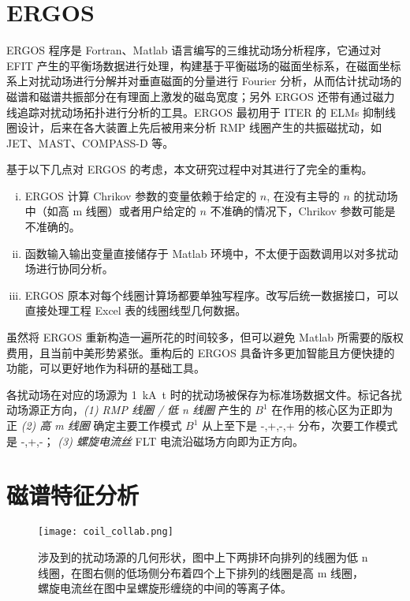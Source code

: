 \section{ERGOS}

ERGOS 程序是 Fortran、Matlab 语言编写的三维扰动场分析程序，它通过对 EFIT 产生的平衡场数据进行处理，构建基于平衡磁场的磁面坐标系，在磁面坐标系上对扰动场进行分解并对垂直磁面的分量进行 Fourier 分析，从而估计扰动场的磁谱和磁谱共振部分在有理面上激发的磁岛宽度；另外 ERGOS 还带有通过磁力线追踪对扰动场拓扑进行分析的工具。ERGOS 最初用于 ITER 的 ELMs 抑制线圈设计，后来在各大装置上先后被用来分析 RMP 线圈产生的共振磁扰动，如 JET、MAST、COMPASS-D 等。

基于以下几点对 ERGOS 的考虑，本文研究过程中对其进行了完全的重构。

\begin{enumerate}[(i)]
  \item ERGOS 计算 Chrikov 参数的变量依赖于给定的 $n$, 在没有主导的 $n$ 的扰动场中（如高 m 线圈）或者用户给定的 $n$ 不准确的情况下，Chrikov 参数可能是不准确的。
  \item 函数输入输出变量直接储存于 Matlab 环境中，不太便于函数调用以对多扰动场进行协同分析。
  \item ERGOS 原本对每个线圈计算场都要单独写程序。改写后统一数据接口，可以直接处理工程 Excel 表的线圈线型几何数据。
\end{enumerate}


虽然将 ERGOS 重新构造一遍所花的时间较多，但可以避免 Matlab 所需要的版权费用，且当前中美形势紧张。重构后的 ERGOS 具备许多更加智能且方便快捷的功能，可以更好地作为科研的基础工具。

各扰动场在对应的场源为 \SI{1}{\kilo\ampere t} 时的扰动场被保存为标准场数据文件。标记各扰动场源正方向，\textit{(1) RMP 线圈 / 低 n 线圈} 产生的 $B^1$ 在作用的核心区为正即为正  \textit{(2) 高 m 线圈} 确定主要工作模式 $B^1$ 从上至下是 -,+,-,+ 分布，次要工作模式是 -,+,-； \textit{(3) 螺旋电流丝} FLT 电流沿磁场方向即为正方向。


  
    


  


\section{磁谱特征分析}

\begin{figure}[htbp]
  \centering%
      \texttt{[image: coil\_collab.png]}
      \caption{涉及到的扰动场源的几何形状，图中上下两排环向排列的线圈为低 n 线圈，在图右侧的低场侧分布着四个上下排列的线圈是高 m 线圈，螺旋电流丝在图中呈螺旋形缠绕的中间的等离子体。}
      \label{fig:current-topo}
\end{figure}

